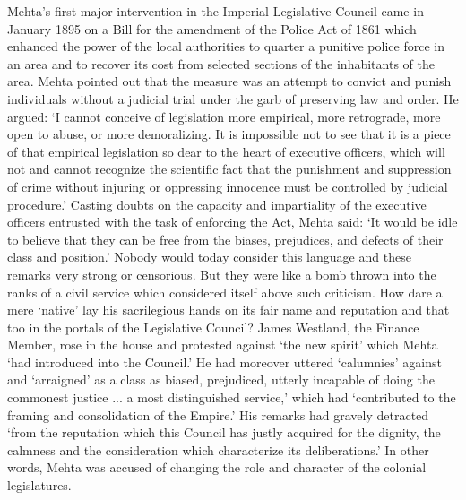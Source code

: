 Mehta's first major intervention in the Imperial Legislative Council came in January 1895 on a Bill for the amendment of the Police Act of 1861 which enhanced the power of the local authorities to quarter a punitive police force in an area and to recover its cost from selected sections of the inhabitants of the area. Mehta pointed out that the measure was an attempt to convict and punish individuals without a judicial trial under the garb of preserving law and order. He argued: `I cannot conceive of legislation more empirical, more retrograde, more open to abuse, or more demoralizing. It is impossible not to see that it is a piece of that empirical legislation so dear to the heart of executive officers, which will not and cannot recognize the scientific fact that the punishment and suppression of crime without injuring or oppressing innocence must be controlled by judicial procedure.' Casting doubts on the capacity and impartiality of the executive officers entrusted with the task of enforcing the Act, Mehta said: `It would be idle to believe that they can be free from the biases, prejudices, and defects of their class and position.' Nobody would today consider this language and these remarks very strong or censorious. But they were like a bomb thrown into the ranks of a civil service which considered itself above such criticism. How dare a mere `native' lay his sacrilegious hands on its fair name and reputation and that too in the portals of the Legislative Council? James Westland, the Finance Member, rose in the house and protested against `the new spirit' which Mehta `had introduced into the Council.' He had moreover uttered `calumnies' against and `arraigned' as a class as biased, prejudiced, utterly incapable of doing the commonest justice ... a most distinguished service,' which had `contributed to the framing and consolidation of the Empire.' His remarks had gravely detracted `from the reputation which this Council has justly acquired for the dignity, the calmness and the consideration which characterize its deliberations.' In other words, Mehta was accused of changing the role and character of the colonial legislatures.

